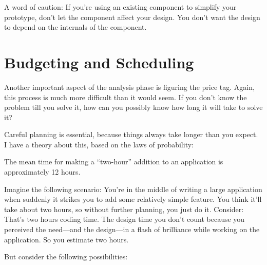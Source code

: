 \noindent A word of caution: If you're using an existing component to
simplify your prototype, don't let the component affect your design.
You don't want the design to depend on the internals of the component.%
%

\section{Budgeting and Scheduling}%
%
%
%

Another important aspect of the analysis phase is figuring the price
tag.  Again, this process is much more difficult than it would seem.
If you don't know the problem till you solve it, how can you possibly
know how long it will take to solve it?

Careful planning is essential, because things always take longer than
you expect. I have a theory about this, based on the laws of
probability:



\begin{tip}
The mean time for making a ``two-hour'' addition to an application is
approximately 12 hours.
\end{tip}

\noindent Imagine the following scenario: You're in the middle of
writing a large application when suddenly it strikes you to add some
relatively simple feature. You think it'll take about two hours, so
without further planning, you just do it. Consider: That's two hours
coding time. The design time you don't count because you perceived the
need---and the design---in a flash of brilliance while working on the
application. So you estimate two hours.

But consider the following possibilities:

